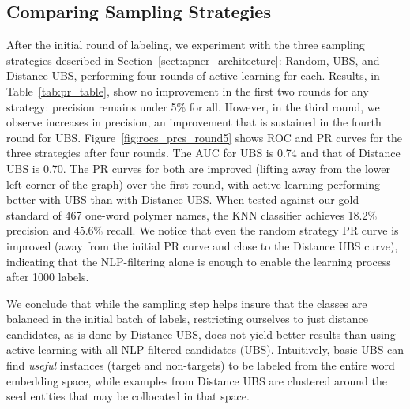 \subsection{Comparing Sampling Strategies}
After the initial round of labeling, we experiment with the three sampling strategies described in Section~\ref{sect:apner_architecture}: Random, UBS, and Distance UBS,
performing four rounds of active learning for each.
Results, in Table~\ref{tab:pr_table}, show
no improvement in the first two rounds for any strategy: %
precision remains under 5\% for all.
However, in the third round, we observe increases in precision,
an improvement that  
is sustained in the fourth round for UBS.
Figure~\ref{fig:rocs_prcs_round5} shows ROC and PR curves for the three strategies after four rounds. 
The AUC for UBS is 0.74 and that of Distance UBS is 0.70. 
The PR curves for both are improved (lifting away from the lower left corner of the graph) over the first round, 
with active learning performing better with UBS than with Distance UBS.
When tested against our gold standard of 467 one-word polymer names, 
the KNN classifier achieves 18.2\% precision and  45.6\% recall. 
We notice that even the random strategy PR curve is improved (away from the initial PR curve and close to the Distance UBS curve), indicating that the NLP-filtering alone is enough to enable the learning process after 1000 labels.

We conclude that while the sampling step
helps insure that the classes are balanced in the initial batch of labels, 
restricting ourselves to just distance candidates, as is done by Distance UBS, does not yield better results than using active learning with all NLP-filtered candidates (UBS).
Intuitively, basic UBS can find \textit{useful} instances (target and non-targets) to be labeled from the entire word embedding space, 
while examples from Distance UBS are clustered around the seed entities that may be collocated in that space.


